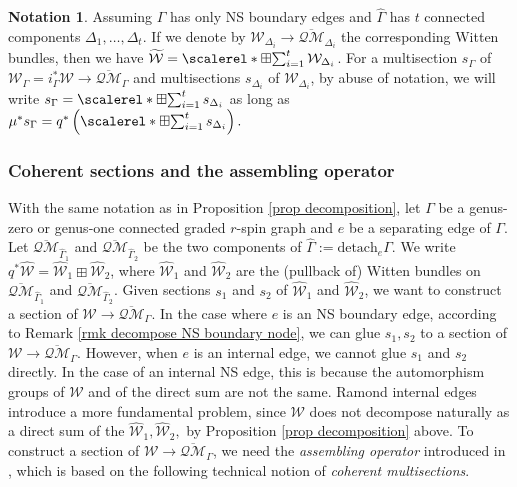 \documentclass[11pt]{amsart}
\theoremstyle{definition}
\newtheorem{nn}[dummy]{Notation}
\theoremstyle{remark}
\newcommand{\oQMb}{{\overline{\mathcal{QM}}}}
\newcommand{\<}{\left<}
\renewcommand{\>}{\right>}
\numberwithin{equation}{section}
\DeclareMathOperator*{\bboxplus}{\scalerel*{\boxplus}{\sum}}
\begin{document}
\begin{nn}
    Assuming $\Gamma$ %
has only NS boundary edges and $\widehat{\Gamma}$ has $t$ connected components $\Delta_1,\dots, \Delta_t$. If we denote by $\mathcal W_{\Delta_i}\to \oQMb_{\Delta_i}$ the corresponding %
Witten bundles, then %
we have $\widetilde{\mathcal W}=\bboxplus_{i=1}^t \mathcal W_{\Delta_i}$. For a multisection $s_{\Gamma}$ of $\mathcal W_{\Gamma}=i_{\Gamma}^* \mathcal W \to \oQMb_{\Gamma}$ and multisections $s_{\Delta_i}$ of $\mathcal W_{\Delta_i}$, 
    by abuse of notation, we will write 
    $
     s_{\Gamma}=\bboxplus_{i=1}^t s_{\Delta_i}
    $
    as long as
    $
     \mu^*s_{\Gamma}= q^*\left(\bboxplus_{i=1}^t s_{\Delta_i} \right).
    $
\end{nn}




\subsubsection{Coherent sections and the assembling operator}\label{sec ass} 

   With the same notation as in Proposition \ref{prop decomposition}, let $\Gamma$ be a genus-zero or genus-one connected graded $r$-spin graph and $e$ be a separating edge %
of $\Gamma$. Let $\oQMb_{\widehat{\Gamma}_1}$ %
and $\oQMb_{\widehat{\Gamma}_2}$ be the two components of $\widehat\Gamma:={\text{detach} }_e{\Gamma}$. We write $q^*\widehat{\mathcal{W}} = \widehat{\mathcal{W}}_1 \boxplus \widehat{\mathcal{W}}_2$, where $\widehat{\mathcal{W}}_1$ and $\widehat{\mathcal{W}}_2$ are the (pullback of) Witten bundles on $\oQMb_{\widehat{\Gamma}_1}$ and $\oQMb_{\widehat{\Gamma}_2}$. 
   Given sections $s_1$ and $s_2$ of $\widehat{\mathcal{W}}_1$ and $\widehat{\mathcal{W}}_2$, we want to construct a section of $\mathcal W \to \oQMb_\Gamma$. In the case where $e$ is an NS boundary edge, according to Remark \ref{rmk decompose NS boundary node}, we can glue $s_1,s_2$ 
 to a section of $\mathcal W \to \oQMb_\Gamma$. However, when $e$ is an internal edge, we cannot glue $s_1$ and $s_2$ directly. In the case of an internal NS edge, this is because the automorphism groups of ${\mathcal{W}}$ and of the direct sum are not the same. Ramond internal edges introduce a more fundamental problem, since ${\mathcal{W}}$ does not decompose naturally as a direct sum of %
the $\widehat{\mathcal{W}}_1,\widehat{\mathcal{W}}_2,$ by %
Proposition \ref{prop decomposition} above. To construct a section of $\mathcal W \to \overline{\mathcal{QM}}_\Gamma$, we need the \textit{assembling operator} introduced in \cite{BCT2}, which is based on the following technical notion of \textit{coherent multisections}. 
  
\end{document}
